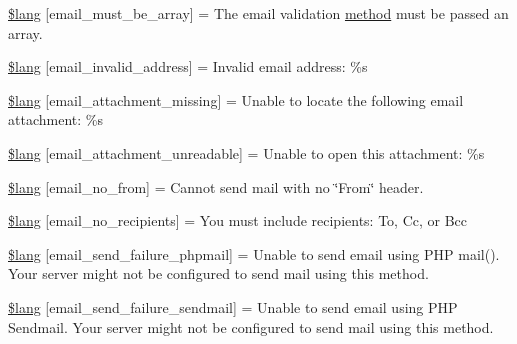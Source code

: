 \begin{DoxyCompactItemize}
\item 
\mbox{\hyperlink{email__lang_8php_acec7cb5b0da8dc5e98981525eff66d55}{\$lang}} \mbox{[}\textquotesingle{}email\+\_\+must\+\_\+be\+\_\+array\textquotesingle{}\mbox{]} = \textquotesingle{}The email validation \mbox{\hyperlink{waiter_2order_8php_ac0cc2006fd803bf741cbbe406e3f6361}{method}} must be passed an array.\textquotesingle{}
\item 
\mbox{\hyperlink{email__lang_8php_af71f7471bf257dfa376cca1e4f0d45f7}{\$lang}} \mbox{[}\textquotesingle{}email\+\_\+invalid\+\_\+address\textquotesingle{}\mbox{]} = \textquotesingle{}Invalid email address\+: \%s\textquotesingle{}
\item 
\mbox{\hyperlink{email__lang_8php_a893b004d605cc0477011aa134b1062a1}{\$lang}} \mbox{[}\textquotesingle{}email\+\_\+attachment\+\_\+missing\textquotesingle{}\mbox{]} = \textquotesingle{}Unable to locate the following email attachment\+: \%s\textquotesingle{}
\item 
\mbox{\hyperlink{email__lang_8php_a47274d77980b4f1c7dd1a414f205bac6}{\$lang}} \mbox{[}\textquotesingle{}email\+\_\+attachment\+\_\+unreadable\textquotesingle{}\mbox{]} = \textquotesingle{}Unable to open this attachment\+: \%s\textquotesingle{}
\item 
\mbox{\hyperlink{email__lang_8php_aa2799a4268ac4f00370657fd57331861}{\$lang}} \mbox{[}\textquotesingle{}email\+\_\+no\+\_\+from\textquotesingle{}\mbox{]} = \textquotesingle{}Cannot send mail with no \char`\"{}From\char`\"{} header.\textquotesingle{}
\item 
\mbox{\hyperlink{email__lang_8php_a878f96e829f7f470e11cbb23db64aa10}{\$lang}} \mbox{[}\textquotesingle{}email\+\_\+no\+\_\+recipients\textquotesingle{}\mbox{]} = \textquotesingle{}You must include recipients\+: To, Cc, or Bcc\textquotesingle{}
\item 
\mbox{\hyperlink{email__lang_8php_a4abc09e5ddc7d7cebed337f301fd9602}{\$lang}} \mbox{[}\textquotesingle{}email\+\_\+send\+\_\+failure\+\_\+phpmail\textquotesingle{}\mbox{]} = \textquotesingle{}Unable to send email using P\+HP mail(). Your server might not be configured to send mail using this method.\textquotesingle{}
\item 
\mbox{\hyperlink{email__lang_8php_a8d4711ce5217c25c96d6368c22a96a27}{\$lang}} \mbox{[}\textquotesingle{}email\+\_\+send\+\_\+failure\+\_\+sendmail\textquotesingle{}\mbox{]} = \textquotesingle{}Unable to send email using P\+HP Sendmail. Your server might not be configured to send mail using this method.\textquotesingle{}

\end{DoxyCompactItemize}
